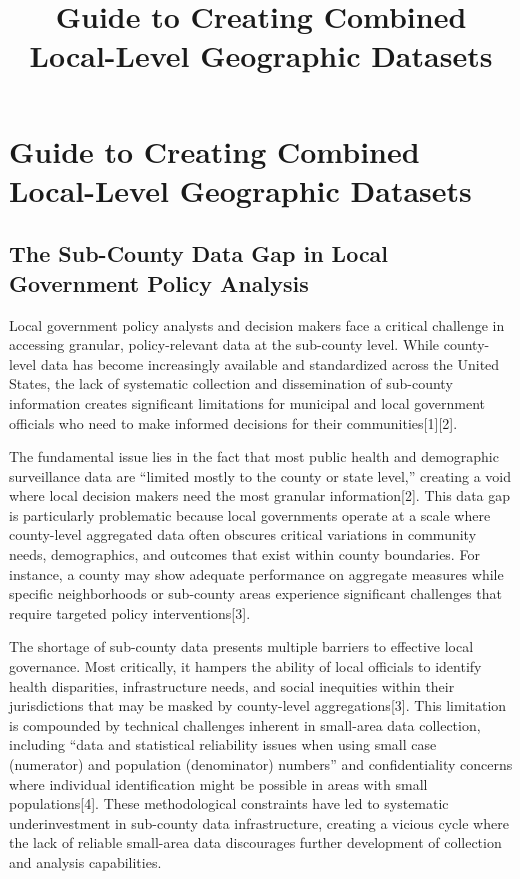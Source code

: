 \documentclass[
  letterpaper,
  DIV=11,
  numbers=noendperiod]{scrartcl}
\title{Guide to Creating Combined Local-Level Geographic Datasets}
\author{}
\date{}
\begin{document}
\maketitle


\section{Guide to Creating Combined Local-Level Geographic
Datasets}\label{guide-to-creating-combined-local-level-geographic-datasets}

\subsection{The Sub-County Data Gap in Local Government Policy
Analysis}\label{the-sub-county-data-gap-in-local-government-policy-analysis}

Local government policy analysts and decision makers face a critical
challenge in accessing granular, policy-relevant data at the sub-county
level. While county-level data has become increasingly available and
standardized across the United States, the lack of systematic collection
and dissemination of sub-county information creates significant
limitations for municipal and local government officials who need to
make informed decisions for their communities{[}1{]}{[}2{]}.

The fundamental issue lies in the fact that most public health and
demographic surveillance data are ``limited mostly to the county or
state level,'' creating a void where local decision makers need the most
granular information{[}2{]}. This data gap is particularly problematic
because local governments operate at a scale where county-level
aggregated data often obscures critical variations in community needs,
demographics, and outcomes that exist within county boundaries. For
instance, a county may show adequate performance on aggregate measures
while specific neighborhoods or sub-county areas experience significant
challenges that require targeted policy interventions{[}3{]}.

The shortage of sub-county data presents multiple barriers to effective
local governance. Most critically, it hampers the ability of local
officials to identify health disparities, infrastructure needs, and
social inequities within their jurisdictions that may be masked by
county-level aggregations{[}3{]}. This limitation is compounded by
technical challenges inherent in small-area data collection, including
``data and statistical reliability issues when using small case
(numerator) and population (denominator) numbers'' and confidentiality
concerns where individual identification might be possible in areas with
small populations{[}4{]}. These methodological constraints have led to
systematic underinvestment in sub-county data infrastructure, creating a
vicious cycle where the lack of reliable small-area data discourages
further development of collection and analysis capabilities.
\end{document}
